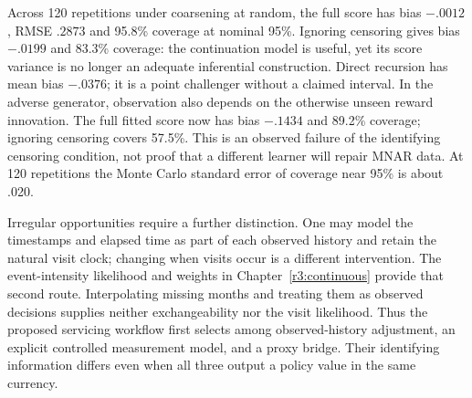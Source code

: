 Across 120 repetitions under coarsening at random, the full score has bias
$-.0012$, RMSE $.2873$ and 95.8\% coverage at nominal 95\%. Ignoring
censoring gives bias $-.0199$ and 83.3\% coverage: the continuation model
is useful, yet its score variance is no longer an adequate inferential
construction. Direct recursion has mean bias $-.0376$; it is a point
challenger without a claimed interval. In the adverse generator, observation
also depends on the otherwise unseen reward innovation. The full fitted
score now has bias $-.1434$ and 89.2\% coverage; ignoring censoring covers
57.5\%. This is an observed failure of the identifying censoring condition,
not proof that a different learner will repair MNAR data. At 120 repetitions
the Monte Carlo standard error of coverage near 95\% is about .020.

Irregular opportunities require a further distinction. One may model the
timestamps and elapsed time as part of each observed history and retain the
natural visit clock; changing when visits occur is a different intervention.
The event-intensity likelihood and weights in Chapter~\ref{r3:continuous}
provide that second route. Interpolating missing months and treating them as
observed decisions supplies neither exchangeability nor the visit likelihood.
Thus the proposed servicing workflow first selects among observed-history
adjustment, an explicit controlled measurement model, and a proxy bridge.
Their identifying information differs even when all three output a policy
value in the same currency.
